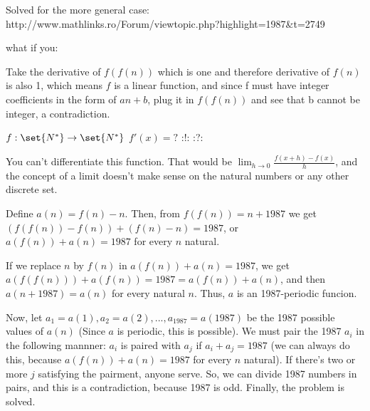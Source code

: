 \begin{solution}
	Solved for the more general case:
http://www.mathlinks.ro/Forum/viewtopic.php?highlight=1987&t=2749
\end{solution}



\begin{solution}
	what if you:

   Take the derivative of $ f(f(n))$ which is one and therefore derivative of $ f(n)$ is also 1, which means $ f$ is a linear function, and since f must have integer coefficients in the form of $ an+b$, plug it in $ f(f(n))$ and see that b cannot be integer, a contradiction.
\end{solution}



\begin{solution}
	$ f: \set{N^*} \to \set{N^*}$
$ f'(x)=?$
 :!:  :?:
\end{solution}



\begin{solution}
	You can't differentiate this function. That would be $ \lim_{h \rightarrow 0} \frac{f(x+h) - f(x)}{h}$, and the concept of a limit doesn't make sense on the natural numbers or any other discrete set.
\end{solution}



\begin{solution}
	Define $a(n)=f(n)-n$. Then, from $f(f(n))=n+1987$ we get $(f(f(n))-f(n))+(f(n)-n)=1987$, or $a(f(n))+a(n)=1987$ for every $n$ natural.

If we replace $n$ by $f(n)$ in $a(f(n))+a(n)=1987$, we get $a(f(f(n)))+a(f(n))=1987=a(f(n))+a(n)$, and then $a(n+1987)=a(n)$ for every natural $n$. Thus, $a$ is an 1987-periodic funcion.

Now, let $a_1=a(1), a_2=a(2),...,a_{1987}=a(1987)$ be the 1987 possible values of $a(n)$ (Since $a$ is periodic, this is possible). We must pair the 1987 $a_i$ in the following mannner: $a_i$ is paired with $a_j$ if $a_i +a_j =1987$ (we can always do this, because $a(f(n))+a(n)=1987$ for every $n$ natural). If there's two or more $j$ satisfying the pairment, anyone serve. So, we can divide 1987 numbers in pairs, and this is a contradiction, because 1987 is odd. Finally, the problem is solved.
\end{solution}



